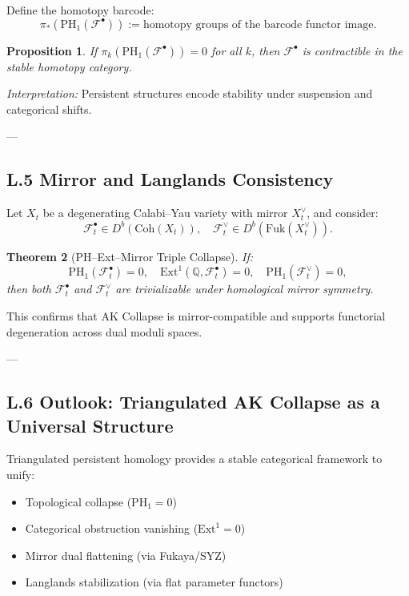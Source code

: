 \documentclass[11pt]{article}
\newtheorem{theorem}{Theorem}[section]
\newtheorem{proposition}[theorem]{Proposition}
\theoremstyle{definition}
\begin{document}
Define the homotopy barcode:
\[
\pi_*(\mathrm{PH}_1(\mathcal{F}^\bullet)) := \text{homotopy groups of the barcode functor image}.
\]

\begin{proposition}
If \( \pi_k(\mathrm{PH}_1(\mathcal{F}^\bullet)) = 0 \) for all \( k \), then \( \mathcal{F}^\bullet \) is contractible in the stable homotopy category.
\end{proposition}

\textit{Interpretation:} Persistent structures encode stability under suspension and categorical shifts.

---

\subsection*{L.5 Mirror and Langlands Consistency}

Let \( X_t \) be a degenerating Calabi–Yau variety with mirror \( X_t^\vee \), and consider:
\[
\mathcal{F}_t^\bullet \in D^b(\mathrm{Coh}(X_t)), \quad \mathcal{F}_t^\vee \in D^b(\mathrm{Fuk}(X_t^\vee)).
\]

\begin{theorem}[PH–Ext–Mirror Triple Collapse]
If:
\[
\mathrm{PH}_1(\mathcal{F}_t^\bullet) = 0, \quad \mathrm{Ext}^1(\mathbb{Q}, \mathcal{F}_t^\bullet) = 0, \quad \mathrm{PH}_1(\mathcal{F}_t^\vee) = 0,
\]
then both \( \mathcal{F}_t^\bullet \) and \( \mathcal{F}_t^\vee \) are trivializable under homological mirror symmetry.
\end{theorem}

This confirms that AK Collapse is mirror-compatible and supports functorial degeneration across dual moduli spaces.

---

\subsection*{L.6 Outlook: Triangulated AK Collapse as a Universal Structure}

Triangulated persistent homology provides a stable categorical framework to unify:

\begin{itemize}
  \item Topological collapse (\( \mathrm{PH}_1 = 0 \))  
  \item Categorical obstruction vanishing (\( \mathrm{Ext}^1 = 0 \))  
  \item Mirror dual flattening (via Fukaya/SYZ)  
  \item Langlands stabilization (via flat parameter functors)  
\end{itemize}
\end{document}
